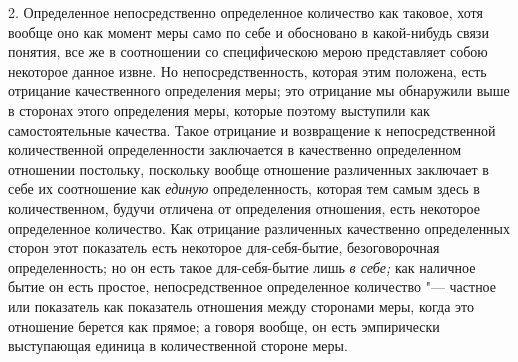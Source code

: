 2. Определенное непосредственно определенное количество как таковое, хотя
вообще оно как момент меры само по себе и обосновано в какой-нибудь связи
понятия, все же в соотношении со специфическою мерою представляет собою
некоторое данное извне. Но непосредственность, которая этим положена, есть
отрицание качественного определения меры; это отрицание мы обнаружили выше
в сторонах этого определения меры, которые поэтому выступили как
самостоятельные качества. Такое отрицание и возвращение к непосредственной
количественной определенности заключается в качественно определенном
отношении постольку, поскольку вообще отношение различенных заключает в
себе их соотношение как {\em единую} определенность,
которая тем самым здесь в количественном, будучи отличена от определения
отношения, есть некоторое определенное количество. Как отрицание
различенных качественно определенных сторон этот показатель есть некоторое
для-себя-бытие, безоговорочная определенность; но он есть такое
для-себя-бытие лишь {\em в себе;} как наличное бытие он
есть простое, непосредственное определенное количество "--- частное или
показатель как показатель отношения между сторонами меры, когда это
отношение берется как прямое; а говоря вообще, он есть эмпирически
выступающая единица в количественной стороне меры.
